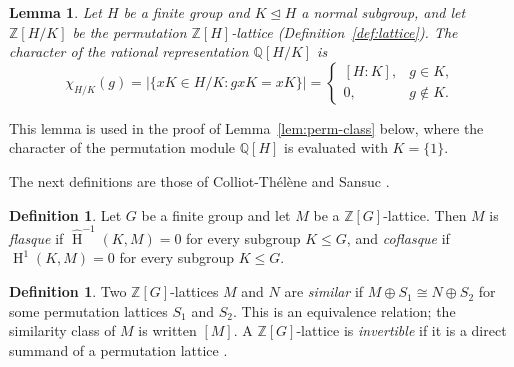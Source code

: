 \documentclass[12pt,a4paper]{article}
\newtheorem{lemma}[theorem]{Lemma}
\theoremstyle{definition}
\newtheorem{definition}[theorem]{Definition}
\DeclareMathOperator{\coh}{H}
\begin{document}
\begin{lemma}\label{lem:perm-char}
Let \(H\) be a finite group and \(K \trianglelefteq H\) a normal
subgroup, and let \(\mathbb{Z}[H/K]\) be the permutation
\(\mathbb{Z}[H]\)-lattice
(Definition~\ref{def:lattice}).  The character of the rational
representation \(\mathbb{Q}[H/K]\) is
\[
\chi_{H/K}(g) = \bigl|\{xK \in H/K : g x K = x K\}\bigr|
= \begin{cases}
[H:K], & g \in K,\\
0, & g \notin K.
\end{cases}
\]
\end{lemma}


This lemma is used in the proof of Lemma~\ref{lem:perm-class} below,
where the character of the permutation module \(\mathbb{Q}[H]\) is
evaluated with \(K = \{1\}\).

\medskip\noindent
The next definitions are those of Colliot-Th\'el\`ene and Sansuc
\cite[\S1]{CTS77}.

\begin{definition}\label{def:flasque-coflasque}
Let \(G\) be a finite group and let \(M\) be a
\(\mathbb{Z}[G]\)-lattice.  Then \(M\) is \emph{flasque} if
\(\hat{\coh}^{-1}(K, M) = 0\) for every subgroup \(K \le G\), and
\emph{coflasque} if \(\coh^1(K, M) = 0\) for every subgroup
\(K \le G\).
\end{definition}

\begin{definition}\label{def:flasque-class}
Two \(\mathbb{Z}[G]\)-lattices \(M\) and \(N\) are \emph{similar} if
\(M \oplus S_1 \cong N \oplus S_2\) for some permutation lattices
\(S_1\) and \(S_2\).  This is an equivalence relation; the similarity
class of \(M\) is written \([M]\).  A \(\mathbb{Z}[G]\)-lattice is
\emph{invertible} if it is a direct summand of a permutation lattice
\cite[\S1]{CTS77}.
\end{definition}
\end{document}
